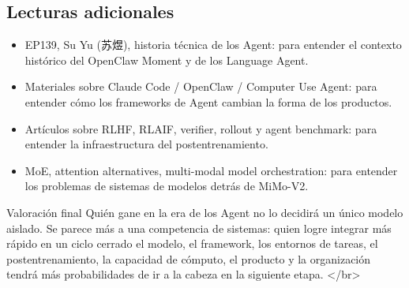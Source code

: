 \subsection{Lecturas adicionales}

\begin{itemize}
\item EP139, Su Yu (苏煜), historia técnica de los Agent: para entender el contexto histórico del OpenClaw Moment y de los Language Agent.
\item Materiales sobre Claude Code / OpenClaw / Computer Use Agent: para entender cómo los frameworks de Agent cambian la forma de los productos.
\item Artículos sobre RLHF, RLAIF, verifier, rollout y agent benchmark: para entender la infraestructura del postentrenamiento.
\item MoE, attention alternatives, multi-modal model orchestration: para entender los problemas de sistemas de modelos detrás de MiMo-V2.
\end{itemize}

\begin{importantbox}{Valoración final}
Quién gane en la era de los Agent no lo decidirá un único modelo aislado. Se parece más a una competencia de sistemas: quien logre integrar más rápido en un ciclo cerrado el modelo, el framework, los entornos de tareas, el postentrenamiento, la capacidad de cómputo, el producto y la organización tendrá más probabilidades de ir a la cabeza en la siguiente etapa.
</br>
\end{importantbox}


